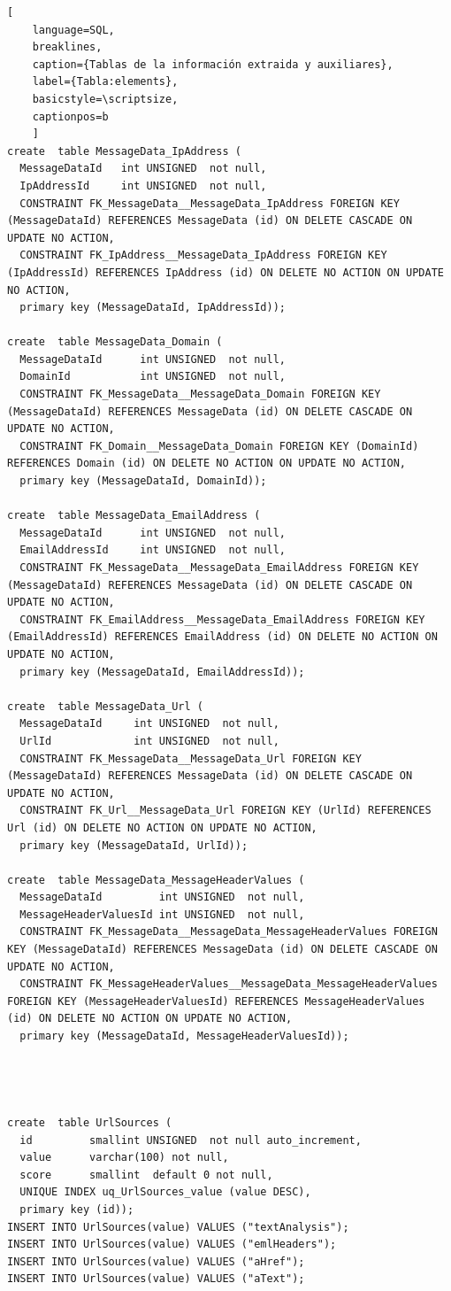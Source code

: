 \begin{lstlisting}[
    language=SQL,
    breaklines, 
    caption={Tablas de la información extraida y auxiliares}, 
    label={Tabla:elements}, 
    basicstyle=\scriptsize,
    captionpos=b
    ]
create  table MessageData_IpAddress (
  MessageDataId   int UNSIGNED  not null, 
  IpAddressId     int UNSIGNED  not null,
  CONSTRAINT FK_MessageData__MessageData_IpAddress FOREIGN KEY (MessageDataId) REFERENCES MessageData (id) ON DELETE CASCADE ON UPDATE NO ACTION,
  CONSTRAINT FK_IpAddress__MessageData_IpAddress FOREIGN KEY (IpAddressId) REFERENCES IpAddress (id) ON DELETE NO ACTION ON UPDATE NO ACTION,
  primary key (MessageDataId, IpAddressId));

create  table MessageData_Domain (
  MessageDataId      int UNSIGNED  not null, 
  DomainId           int UNSIGNED  not null,
  CONSTRAINT FK_MessageData__MessageData_Domain FOREIGN KEY (MessageDataId) REFERENCES MessageData (id) ON DELETE CASCADE ON UPDATE NO ACTION,
  CONSTRAINT FK_Domain__MessageData_Domain FOREIGN KEY (DomainId) REFERENCES Domain (id) ON DELETE NO ACTION ON UPDATE NO ACTION,
  primary key (MessageDataId, DomainId));

create  table MessageData_EmailAddress (
  MessageDataId      int UNSIGNED  not null, 
  EmailAddressId     int UNSIGNED  not null,
  CONSTRAINT FK_MessageData__MessageData_EmailAddress FOREIGN KEY (MessageDataId) REFERENCES MessageData (id) ON DELETE CASCADE ON UPDATE NO ACTION,
  CONSTRAINT FK_EmailAddress__MessageData_EmailAddress FOREIGN KEY (EmailAddressId) REFERENCES EmailAddress (id) ON DELETE NO ACTION ON UPDATE NO ACTION,
  primary key (MessageDataId, EmailAddressId));

create  table MessageData_Url (
  MessageDataId     int UNSIGNED  not null, 
  UrlId             int UNSIGNED  not null,
  CONSTRAINT FK_MessageData__MessageData_Url FOREIGN KEY (MessageDataId) REFERENCES MessageData (id) ON DELETE CASCADE ON UPDATE NO ACTION,
  CONSTRAINT FK_Url__MessageData_Url FOREIGN KEY (UrlId) REFERENCES Url (id) ON DELETE NO ACTION ON UPDATE NO ACTION,
  primary key (MessageDataId, UrlId));

create  table MessageData_MessageHeaderValues (
  MessageDataId         int UNSIGNED  not null, 
  MessageHeaderValuesId int UNSIGNED  not null,
  CONSTRAINT FK_MessageData__MessageData_MessageHeaderValues FOREIGN KEY (MessageDataId) REFERENCES MessageData (id) ON DELETE CASCADE ON UPDATE NO ACTION,
  CONSTRAINT FK_MessageHeaderValues__MessageData_MessageHeaderValues FOREIGN KEY (MessageHeaderValuesId) REFERENCES MessageHeaderValues (id) ON DELETE NO ACTION ON UPDATE NO ACTION,
  primary key (MessageDataId, MessageHeaderValuesId));




create  table UrlSources (
  id         smallint UNSIGNED  not null auto_increment, 
  value      varchar(100) not null, 
  score      smallint  default 0 not null, 
  UNIQUE INDEX uq_UrlSources_value (value DESC),
  primary key (id));
INSERT INTO UrlSources(value) VALUES ("textAnalysis");
INSERT INTO UrlSources(value) VALUES ("emlHeaders");
INSERT INTO UrlSources(value) VALUES ("aHref");
INSERT INTO UrlSources(value) VALUES ("aText");


\end{lstlisting}
